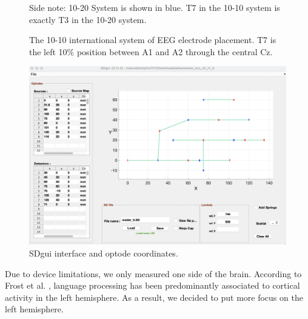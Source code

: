\begin{figure}[H]
  \centering
  \caption{The 10-10 international system of EEG electrode placement. T7 is the left 10\% position between A1 and A2 through the central Cz.}
  \label{fig:tenten}
  \medskip
  \footnotesize {Side note: 10-20 System is shown in blue. T7 in the 10-10 system is exactly T3 in the 10-20 system.}

\end{figure}



\begin{figure}[H]
  \centering
    \includegraphics[scale=.4]{bilder/SDgui.png}
  \caption{SDgui interface and optode coordinates.}
  \label{fig:sdgui}
\end{figure}
Due to device limitations, we only measured one side of the brain. According to Frost et al. \citeyearpar {Frost1999-vs} , language processing has been predominantly associated to cortical activity in the left hemisphere. As a result, we decided to put more focus on the left hemisphere.

